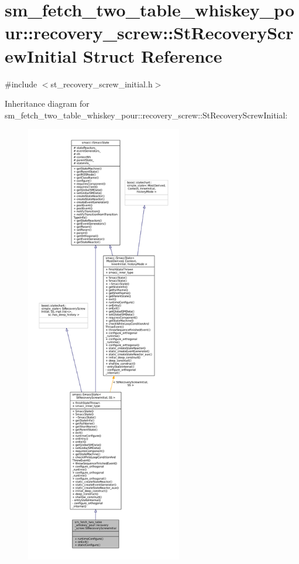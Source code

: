 \hypertarget{structsm__fetch__two__table__whiskey__pour_1_1recovery__screw_1_1StRecoveryScrewInitial}{}\section{sm\+\_\+fetch\+\_\+two\+\_\+table\+\_\+whiskey\+\_\+pour\+:\+:recovery\+\_\+screw\+:\+:St\+Recovery\+Screw\+Initial Struct Reference}
\label{structsm__fetch__two__table__whiskey__pour_1_1recovery__screw_1_1StRecoveryScrewInitial}


{\ttfamily \#include $<$st\+\_\+recovery\+\_\+screw\+\_\+initial.\+h$>$}



Inheritance diagram for sm\+\_\+fetch\+\_\+two\+\_\+table\+\_\+whiskey\+\_\+pour\+:\+:recovery\+\_\+screw\+:\+:St\+Recovery\+Screw\+Initial\+:
\nopagebreak
\begin{figure}[H]
\begin{center}
\leavevmode
\includegraphics[height=550pt]{structsm__fetch__two__table__whiskey__pour_1_1recovery__screw_1_1StRecoveryScrewInitial__inherit__graph}
\end{center}
\end{figure}


